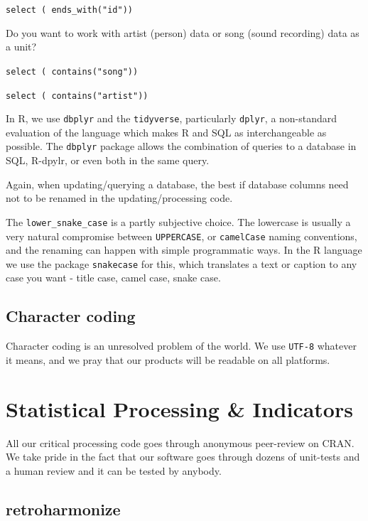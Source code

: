 \documentclass[
  fontsize=13pt,
  english,
  a4paper,
  openany, a4paper, oneside]{book}
\begin{document}
\texttt{select\ (\ ends\_with("id"))}

Do you want to work with artist (person) data or song (sound recording) data as a unit?

\texttt{select\ (\ contains("song"))}

\texttt{select\ (\ contains("artist"))}

In R, we use \texttt{dbplyr} and the \texttt{tidyverse}, particularly \texttt{dplyr}, a non-standard evaluation of the language which makes R and SQL as interchangeable as possible. The \texttt{dbplyr} package allows the combination of queries to a database in SQL, R-dpylr, or even both in the same query.

Again, when updating/querying a database, the best if database columns need not to be renamed in the updating/processing code.

The \texttt{lower\_snake\_case} is a partly subjective choice. The lowercase is usually a very natural compromise between \texttt{UPPERCASE}, or \texttt{camelCase} naming conventions, and the renaming can happen with simple programmatic ways. In the R language we use the package \texttt{snakecase} for this, which translates a text or caption to any case you want - title case, camel case, snake case.

\hypertarget{character-coding}{%
\subsection{Character coding}\label{character-coding}}

Character coding is an unresolved problem of the world. We use \texttt{UTF-8} whatever it means, and we pray that our products will be readable on all platforms.

\hypertarget{statistical-software}{%
\section{Statistical Processing \& Indicators}\label{statistical-software}}

All our critical processing code goes through anonymous peer-review on CRAN. We take pride in the fact that our software goes through dozens of unit-tests and a human review and it can be tested by anybody.

\hypertarget{retroharmonize}{%
\subsection{retroharmonize}\label{retroharmonize}}
\end{document}
